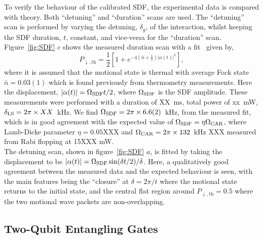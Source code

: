     To verify the behaviour of the calibrated SDF, the experimental data is compared with theory. Both
    ``detuning'' and ``duration'' scans are used. The ``detuning'' scan is performed by
    varying the detuning, $\delta_g$, of the interaction, whilst keeping the
    SDF duration, $t$, constant, and vice-versa for the ``duration'' scan. \\
    Figure~\ref{fig:SDF} $c$ shows the measured duration scan with a fit~\cite{burd2020squeezing} given by,
    \begin{equation}
        P_{\downarrow,\mathrm{th}} = \frac{1}{2} \left[ 1 + e^{-4\left( \bar{n} + \frac{1}{2} \right) |\alpha(t)|^2} \right],
    \end{equation}
    where it is assumed that the motional state is thermal with average Fock state $\bar{n}
    = 0.03(1)$ which is found previously from thermometry measurements. Here the
    displacement, $|\alpha(t)| = \Omega_{\rm SDF} t/2$, where $\Omega_{\rm SDF}$ is the
    SDF amplitude. 
    These measurements were performed with a duration of XX~ms, total power of xx~mW, $\delta_{\rm LS}=2\pi\times XX$~\unit{\kHz}.
    We find $\Omega_{\rm SDF} = 2\pi\times 6.6(2)$~\unit{\kHz}, from the
    measured fit, which is in good agreement with the expected value of
    $\Omega_{\rm SDF} = \eta\Omega_{\rm CAR}$, where Lamb-Dicke parameter $\eta =
    0.05$XXX and $\Omega_{\rm CAR} = 2\pi \times 132$~\unit{\kHz} XXX measured from Rabi
    flopping at 15XXX mW.\\
    The detuning scan, shown in figure~\ref{fig:SDF} $a$, is fitted by taking the
    displacement to be $|\alpha(t)| = \Omega_{\rm SDF} \sin(\delta t/2)/\delta$. Here,
    a qualitatively good agreement between the measured data and the
    expected behaviour is seen, with the main features being the ``closure''
    at $\delta = 2\pi/t$ where the motional state returns to the initial state,
    and the central flat region around $P_{\downarrow, \mathrm{th}} =0.5$ where
    the two motional wave packets are non-overlapping.\\


\subsection{Two-Qubit Entangling Gates}
\label{sec:Two-Qubit Entangling Gates}

